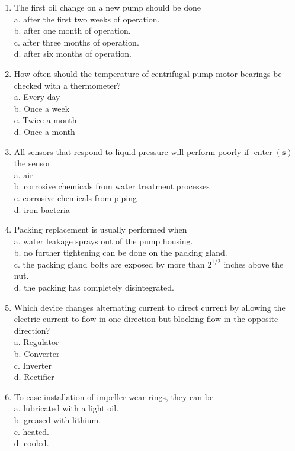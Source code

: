 \documentclass[10pt]{article}
\begin{document}
\begin{enumerate}
  \item The first oil change on a new pump should be done\\
a. after the first two weeks of operation.\\
b. after one month of operation.\\
c. after three months of operation.\\
d. after six months of operation.

  \item How often should the temperature of centrifugal pump motor bearings be checked with a thermometer?\\
a. Every day\\
b. Once a week\\
c. Twice a month\\
d. Once a month

  \item All sensors that respond to liquid pressure will perform poorly if $\operatorname{enter}(\mathbf{s})$ the sensor.\\
a. air\\
b. corrosive chemicals from water treatment processes\\
c. corrosive chemicals from piping\\
d. iron bacteria

  \item Packing replacement is usually performed when\\
a. water leakage sprays out of the pump housing.\\
b. no further tightening can be done on the packing gland.\\
c. the packing gland bolts are exposed by more than $2^{1 / 2}$ inches above the nut.\\
d. the packing has completely disintegrated. 

\item Which device changes alternating current to direct current by allowing the electric current to flow in one direction but blocking flow in the opposite direction?\\
a. Regulator\\
b. Converter\\
c. Inverter\\
d. Rectifier

  \item To ease installation of impeller wear rings, they can be\\
a. lubricated with a light oil.\\
b. greased with lithium.\\
c. heated.\\
d. cooled.


\end{enumerate}
\end{document}

